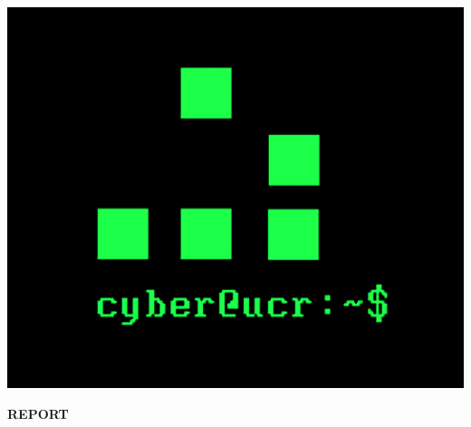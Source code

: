 \documentclass{article}
\begin{document}
\begin{center}
	\includegraphics[scale=0.25]{Cyber_525x438.png}\\
\end{center}
\centerline{\large \bf REPORT}
\end{document}
